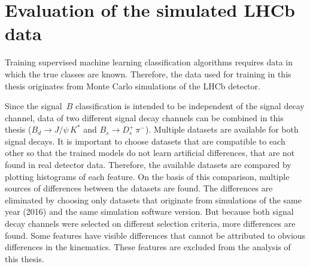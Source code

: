 \section{Evaluation of the simulated LHCb data}

Training supervised machine learning classification algorithms requires data in which the true classes are known.
Therefore, the data used for training in this thesis originates from Monte Carlo simulations of the LHCb detector. %

Since the signal~$B$ classification is intended to be independent of the signal decay channel, data of two different signal decay channels can be combined in this thesis ($B_d \rightarrow J/\psi \, K^*$ and $B_s \rightarrow D^+_s \, \pi^-$). %
Multiple datasets are available for both signal decays.
It is important to choose datasets that are compatible to each other so that the trained models do not learn artificial differences, that are not found in real detector data.
Therefore, the available datasets are compared by plotting histograms of each feature.
On the basis of this comparison, multiple sources of differences between the datasets are found.
The differences are eliminated by choosing only datasets that originate from simulations of the same year (2016) and the same simulation software version.
But because both signal decay channels were selected on different selection criteria, more differences are found.
Some features have visible differences that cannot be attributed to obvious differences in the kinematics. %
These features are excluded from the analysis of this thesis.





